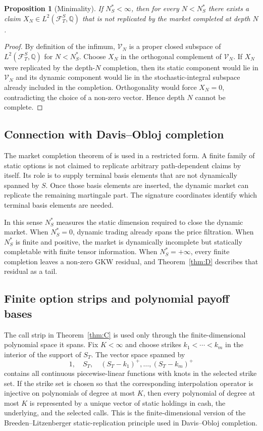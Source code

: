 \documentclass[11pt,oneside]{article}
\theoremstyle{plain}
\newtheorem{proposition}[theorem]{Proposition}
\theoremstyle{definition}
\theoremstyle{remark}
\newcommand{\Q}{\mathbb{Q}}
\newcommand{\FS}{\mathcal F^S}
\begin{document}
\begin{proposition}[Minimality]
\label{prop:depth-minimality}
If $N_S^\ast<\infty$, then for every $N<N_S^\ast$ there exists a claim $X_N\in L^2(\FS_T,\Q)$ that is not replicated by the market completed at depth $N$.
\end{proposition}

\begin{proof}
By definition of the infimum, $\mathcal V_N$ is a proper closed subspace of $L^2(\FS_T,\Q)$ for $N<N_S^\ast$. Choose $X_N$ in the orthogonal complement of $\mathcal V_N$. If $X_N$ were replicated by the depth-$N$ completion, then its static component would lie in $\mathcal V_N$ and its dynamic component would lie in the stochastic-integral subspace already included in the completion. Orthogonality would force $X_N=0$, contradicting the choice of a non-zero vector. Hence depth $N$ cannot be complete.
\end{proof}

\subsection{Connection with Davis--Obloj completion}
\label{subsec:davis-obloj-connection}
The market completion theorem of \citet{DavisObloj2008} is used in a restricted form. A finite family of static options is not claimed to replicate arbitrary path-dependent claims by itself. Its role is to supply terminal basis elements that are not dynamically spanned by $S$. Once those basis elements are inserted, the dynamic market can replicate the remaining martingale part. The signature coordinates identify which terminal basis elements are needed.

In this sense $N_S^\ast$ measures the static dimension required to close the dynamic market. When $N_S^\ast=0$, dynamic trading already spans the price filtration. When $N_S^\ast$ is finite and positive, the market is dynamically incomplete but statically completable with finite tensor information. When $N_S^\ast=+\infty$, every finite completion leaves a non-zero GKW residual, and Theorem~\ref{thm:D} describes that residual as a tail.


\subsection{Finite option strips and polynomial payoff bases}
\label{subsec:finite-option-bases}
The call strip in Theorem~\ref{thm:C} is used only through the finite-dimensional polynomial space it spans. Fix $K<\infty$ and choose strikes $k_1<\cdots<k_m$ in the interior of the support of $S_T$. The vector space spanned by
\[
1,\quad S_T,
\quad (S_T-k_1)^+,
\ldots,
(S_T-k_m)^+
\]
contains all continuous piecewise-linear functions with knots in the selected strike set. If the strike set is chosen so that the corresponding interpolation operator is injective on polynomials of degree at most $K$, then every polynomial of degree at most $K$ is represented by a unique vector of static holdings in cash, the underlying, and the selected calls. This is the finite-dimensional version of the Breeden--Litzenberger static-replication principle used in Davis--Obloj completion.
\end{document}
